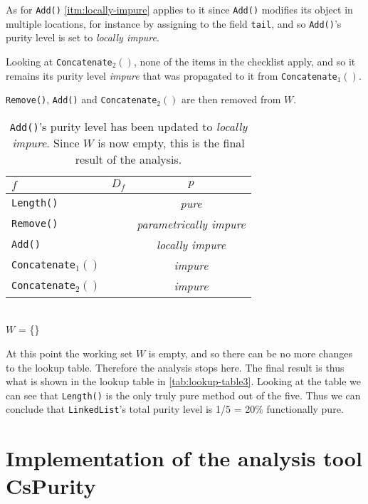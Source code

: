 \documentclass[a4paper,12pt]{article}
\begin{document}
As for \texttt{Add()} \autoref{itm:locally-impure} applies to it since \texttt{Add()} modifies its object in multiple locations, for instance by assigning to the field \texttt{tail}, and so \texttt{Add()}'s purity level is set to \textit{locally impure}.

Looking at \texttt{Concatenate$_2()$}, none of the items in the checklist apply, and so it remains its purity level \textit{impure} that was propagated to it from \texttt{Concatenate$_1()$}.

\texttt{Remove()}, \texttt{Add()} and \texttt{Concatenate$_2()$} are then removed from $W$.

\begin{table}[H]
  \caption{\texttt{Add()}'s purity level has been updated to \textit{locally impure}. Since $W$ is now empty, this is the final result of the analysis.}
  \label{tab:lookup-table3}
  \centering
  \begin{tabular}{|l|c|c|}
    \hline
    $f$                        & $D_f$                  & $p$                            \\ \hline
    \texttt{Length()}          &                        & \textit{pure}                         \\
    \texttt{Remove()}          &                        & \textit{parametrically impure}        \\
    \texttt{Add()}             &                        & \textit{locally impure}               \\
    \texttt{Concatenate$_1()$}  &                        & \textit{impure}                       \\
    \texttt{Concatenate$_2()$}  &                        & \textit{impure}                       \\ \hline
  \end{tabular}
  \\
  $W$ = \{\}
\end{table}

At this point the working set $W$ is empty, and so there can be no more changes to the lookup table. Therefore the analysis stops here. The final result is thus what is shown in the lookup table in \autoref{tab:lookup-table3}. Looking at the table we can see that \texttt{Length()} is the only truly pure method out of the five. Thus we can conclude that \texttt{LinkedList}'s total purity level is 1/5 = 20\% functionally pure.

\section{Implementation of the analysis tool CsPurity} \label{sec:Implementation of the analysis tool}
\end{document}
